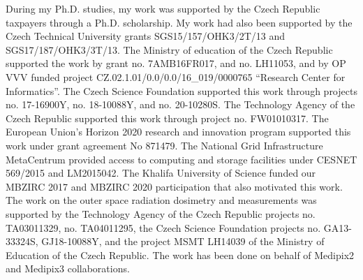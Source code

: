 During my Ph.D. studies, my work was supported by the Czech Republic taxpayers through a Ph.D. scholarship.
My work had also been supported by the Czech Technical University grants SGS15/157/OHK3/2T/13 and SGS17/187/OHK3/3T/13.
The Ministry of education of the Czech Republic supported the work by grant no. 7AMB16FR017, and no. LH11053, and by OP VVV funded project CZ.02.1.01/0.0/0.0/16\_019/0000765 ``Research Center for Informatics''.
The Czech Science Foundation supported this work through projects no. 17-16900Y, no. 18-10088Y, and no. 20-10280S.
The Technology Agency of the Czech Republic supported this work through project no. FW01010317.
The European Union's Horizon 2020 research and innovation program supported this work under grant agreement No 871479.
The National Grid Infrastructure MetaCentrum provided access to computing and storage facilities under CESNET 569/2015 and LM2015042.
The Khalifa University of Science funded our MBZIRC 2017 and MBZIRC 2020 participation that also motivated this work.
The work on the outer space radiation dosimetry and measurements was supported by the Technology Agency of the Czech Republic projects no. TA03011329, no. TA04011295, the Czech Science Foundation projects no. GA13-33324S, GJ18-10088Y, and the project MSMT LH14039 of the Ministry of Education of the Czech Republic.
The work has been done on behalf of Medipix2 and Medipix3 collaborations.

\vspace{2.5cm}
